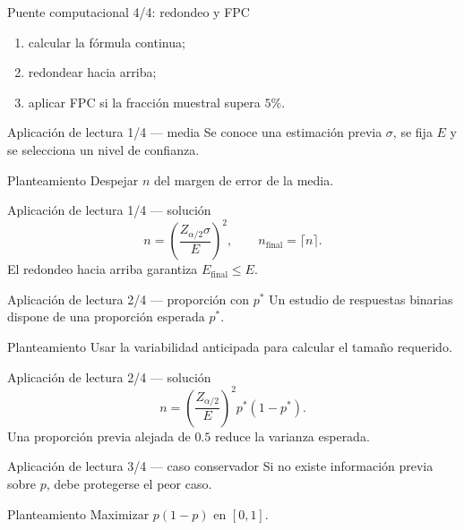\documentclass[10pt,aspectratio=169]{beamer}
\begin{document}
\begin{frame}{Puente computacional 4/4: redondeo y FPC}
  \footnotesize
  \begin{enumerate}\itemsep=0.12cm
    \item calcular la fórmula continua;
    \item redondear hacia arriba;
    \item aplicar FPC si la fracción muestral supera $5\%$.
  \end{enumerate}
\end{frame}

\begin{frame}{Aplicación de lectura 1/4 --- media}
  \footnotesize
  Se conoce una estimación previa $\sigma$, se fija $E$ y se selecciona un
  nivel de confianza.
  \begin{block}{Planteamiento}
    Despejar $n$ del margen de error de la media.
  \end{block}
\end{frame}

\begin{frame}{Aplicación de lectura 1/4 --- solución}
  \footnotesize
  \[
    n=\left(\frac{Z_{\alpha/2}\sigma}{E}\right)^2,
    \qquad n_{\text{final}}=\lceil n\rceil.
  \]
  El redondeo hacia arriba garantiza $E_{\text{final}}\le E$.
\end{frame}

\begin{frame}{Aplicación de lectura 2/4 --- proporción con $p^*$}
  \footnotesize
  Un estudio de respuestas binarias dispone de una proporción esperada $p^*$.
  \begin{block}{Planteamiento}
    Usar la variabilidad anticipada para calcular el tamaño requerido.
  \end{block}
\end{frame}

\begin{frame}{Aplicación de lectura 2/4 --- solución}
  \footnotesize
  \[
    n=\left(\frac{Z_{\alpha/2}}{E}\right)^2p^*(1-p^*).
  \]
  Una proporción previa alejada de $0.5$ reduce la varianza esperada.
\end{frame}

\begin{frame}{Aplicación de lectura 3/4 --- caso conservador}
  \footnotesize
  Si no existe información previa sobre $p$, debe protegerse el peor caso.
  \begin{block}{Planteamiento}
    Maximizar $p(1-p)$ en $[0,1]$.
  \end{block}
\end{frame}
\end{document}
